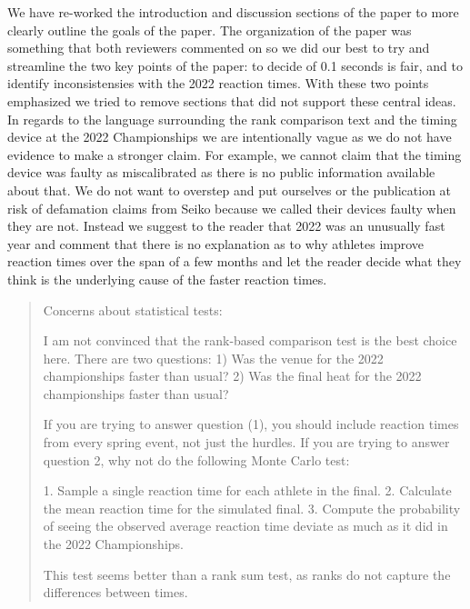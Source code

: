 \documentclass[12pt]{article}
\newenvironment{comment}%
{\begin{quotation}\noindent\small\it\color{darkblue}\ignorespaces%
}{\end{quotation}}
\begin{document}
We have re-worked the introduction and discussion sections of the paper to more
clearly outline the goals of the paper.  The organization of the paper was
something that both reviewers commented on so we did our best to try and
streamline the two key points of the paper: to decide of 0.1 seconds is fair,
and to identify inconsistensies with the 2022 reaction times. With these two
points emphasized we tried to remove sections that did not support these central
ideas.  In regards to the language surrounding the rank comparison text and the
timing device at the 2022 Championships we are intentionally vague as we do not
have evidence to make a stronger claim.  For example, we cannot claim that the
timing device was faulty as miscalibrated as there is no public information
available about that.  We do not want to overstep and put ourselves or the
publication at risk of defamation claims from Seiko because we called their
devices faulty when they are not.  Instead we suggest to the reader that 2022
was an unusually fast year and comment that there is no explanation as to why
athletes improve reaction times over the span of a few months and let the reader
decide what they think is the underlying cause of the faster reaction times.


\begin{comment}
Concerns about statistical tests:

I am not convinced that the rank-based comparison test is the best choice here.
There are two questions: 1) Was the venue for the 2022 championships faster than
usual? 2) Was the final heat for the 2022 championships faster than usual?

If you are trying to answer question (1), you should include reaction times from
every spring event, not just the hurdles. If you are trying to answer question
2, why not do the following Monte Carlo test:

1. Sample a single reaction time for each athlete in the final.
2. Calculate the mean reaction time for the simulated final.
3. Compute the probability of seeing the observed average reaction time deviate
as much as it did in the 2022 Championships.

This test seems better than a rank sum test, as ranks do not capture the
differences between times.

\end{comment}
\end{document}
